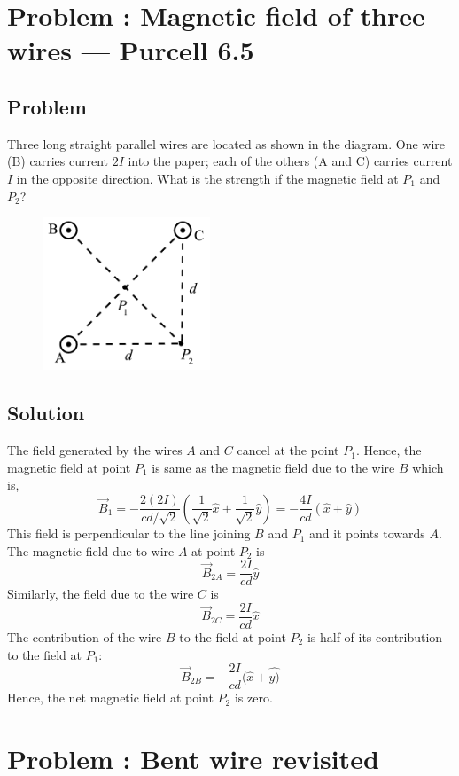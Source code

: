 \documentclass[solutions]{esg8022pset}
\begin{document}
\section{Problem \thesection: Magnetic field of three wires --- Purcell 6.5}
\subsection{Problem}
  Three long straight parallel wires are located as shown in the diagram. One
  wire (B) carries current $2 I$ into the paper; each of the others (A and C)
  carries current $I$ in the opposite direction. What is the strength if the
  magnetic field at $P_1$ and $P_{2}$?
  \begin{figure}[H]
    \centering
    \includegraphics[width = 5cm]{Threewires}
  \end{figure}
\subsection{Solution}
  The field generated by the wires $A$ and $C$ cancel at the point $P_{1}$.
  Hence, the magnetic field at point $P_{1}$ is same as the magnetic field due
  to the wire $B$ which is,
  $$\vec{B}_{1} = -\frac{2 (2I)}{ c d/\sqrt{2}} \left( \frac{1}{\sqrt{2} } \hat{x}+\frac{1}{\sqrt{2} } \hat{y} \right) = -\frac{4I}{cd} ( \hat{x} +  \hat{y})$$
  This field is perpendicular to the line joining $B$ and $P_{1}$ and it points
  towards $A$.\\
  \noindent  The magnetic field due to wire $A$ at point $P_{2}$ is
  $$\vec{B}_{2A} =\frac {2 I}{cd}  \hat{y}$$
  Similarly, the field due to the wire $C$ is
  $$\vec{B}_{2C} = \frac{2 I}{cd}  \hat{x}$$
  The contribution of the wire $B$ to the field at point $P_{2}$ is half of its contribution to the field at $P_{1}$:
  $$\vec{B}_{2B} =  -\frac{2I}{cd} ( \hat{x} +  \hat{y)}$$
  Hence, the net magnetic field at point $P_{2}$ is zero.
\section{Problem \thesection: Bent wire revisited}
\end{document}
